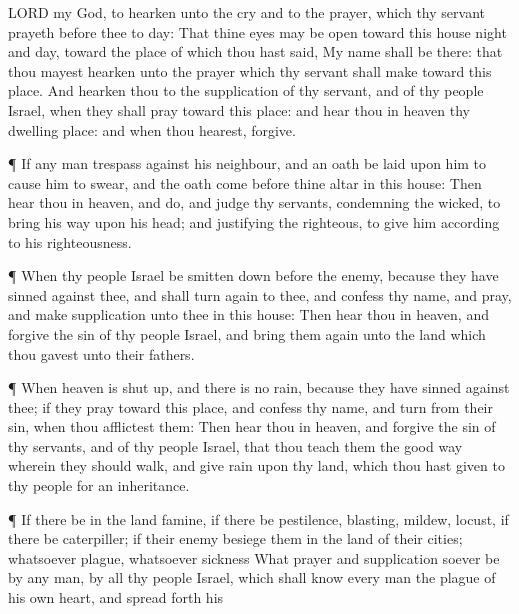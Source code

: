 {{{LORD}} my
God, to
hearken unto the
cry and to the
prayer, which thy
servant
prayeth
before thee to
day:
That thine
eyes may be
open toward this
house
night and
day,
{} toward the
place of which thou hast
said, My
name shall be there: that thou mayest
hearken unto the
prayer which thy
servant shall
make toward this
place.
And
hearken thou to the
supplication of thy
servant, and of thy
people
Israel, when they shall
pray toward this
place: and
hear thou in
heaven thy
dwelling
place: and when thou
hearest,
forgive.
\par }{\PP {}¶ If any
man
trespass against his
neighbour, and an
oath be
laid upon him to cause him to
swear, and the
oath
come
before thine
altar in this
house:
Then
hear thou in
heaven, and
do, and
judge thy
servants,
condemning the
wicked, to
bring his
way upon his
head; and
justifying the
righteous, to
give him according to his
righteousness.
\par }{\PP {}¶ When thy
people
Israel be smitten
down
before the
enemy, because they have
sinned against thee, and shall turn
again to thee, and
confess thy
name, and
pray, and make
supplication unto thee in this
house:
Then
hear thou in
heaven, and
forgive the
sin of thy
people
Israel, and bring them
again unto the
land which thou
gavest unto their
fathers.
\par }{\PP {}¶ When
heaven is shut
up, and there is no
rain, because they have
sinned against thee; if they
pray toward this
place, and
confess thy
name, and
turn from their
sin, when thou
afflictest them:
Then
hear thou in
heaven, and
forgive the
sin of thy
servants, and of thy
people
Israel, that thou
teach them the
good
way wherein they should
walk, and
give
rain upon thy
land, which thou hast
given to thy
people for an
inheritance.
\par }{\PP {}¶ If there be in the
land
famine, if there be
pestilence,
blasting,
mildew,
locust,
{} if there be
caterpiller; if their
enemy
besiege them in the
land of their
cities; whatsoever
plague, whatsoever
sickness
{}
What
prayer and
supplication soever be
{} by any
man,
{} by all thy
people
Israel, which shall
know every
man the
plague of his own
heart, and spread
forth his
}

